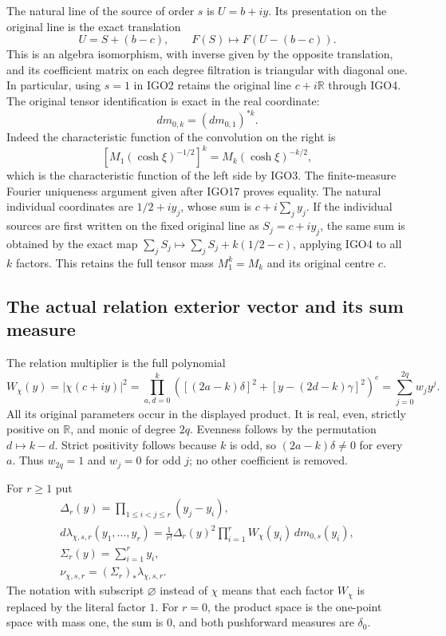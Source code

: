 \documentclass[11pt,a4paper]{article}
\begin{document}
The natural line of the source of order $s$ is $U=b+iy$.
Its presentation on the original line is the exact translation
\[
 U=S+(b-c),\qquad
 F(S)\longmapsto F(U-(b-c)).
 \tag{IGO4}
\]
This is an algebra isomorphism, with inverse given by the opposite
translation, and its coefficient matrix on each degree filtration
is triangular with diagonal one. In particular, using $s=1$ in
IGO2 retains the original line $c+i\mathbb R$ through IGO4.
The original tensor identification is exact in the real coordinate:
\[
 dm_{0,k}=(dm_{0,1})^{*k}.
\]
Indeed the characteristic function of the convolution on the right
is \[[M_1(\cosh\xi)^{-1/2}]^k
=M_k(\cosh\xi)^{-k/2},\] which is the characteristic function
of the left side by IGO3. The finite-measure Fourier uniqueness
argument given after IGO17 proves equality. The natural individual
coordinates are $1/2+iy_j$, whose sum is $c+i\sum_jy_j$.
If the individual sources are first written on the fixed original
line as $S_j=c+iy_j$, the same sum is obtained by the exact map
$\sum_jS_j\mapsto\sum_jS_j+k(1/2-c)$, applying IGO4 to all
$k$ factors. This retains the full tensor mass $M_1^k=M_k$
and its original centre $c$.

\subsection{The actual relation exterior vector and its sum measure}
The relation multiplier is the full polynomial
\[
 W_\chi(y)=|\chi(c+iy)|^2
 =\prod_{a,d=0}^{k}
 \left([(2a-k)\delta]^2+[y-(2d-k)\gamma]^2\right)^e
 =\sum_{j=0}^{2q}w_jy^j.
 \tag{IGO5}
\]
All its original parameters occur in the displayed product.
It is real, even, strictly positive on $\mathbb R$, and monic of
degree $2q$. Evenness follows by the permutation $d\mapsto k-d$.
Strict positivity follows because $k$ is odd, so
$(2a-k)\delta\ne0$ for every $a$. Thus $w_{2q}=1$ and
$w_j=0$ for odd $j$; no other coefficient is removed.

For $r\geq1$ put
\[
 \begin{gathered}
 \Delta_r(y)=\prod_{1\leq i<j\leq r}(y_j-y_i),\\
 d\lambda_{\chi,s,r}(y_1,\ldots,y_r)
 =\frac1{r!}\Delta_r(y)^2
       \prod_{i=1}^r W_\chi(y_i)\,dm_{0,s}(y_i),
 \\ \Sigma_r(y)=\sum_{i=1}^r y_i,
 \\
 \nu_{\chi,s,r}=(\Sigma_r)_*\lambda_{\chi,s,r}.
 \end{gathered}
 \tag{IGO6}
\]
The notation with subscript $\varnothing$ instead of $\chi$ means
that each factor $W_\chi$ is replaced by the literal factor $1$.
For $r=0$, the product space is the one-point space with mass one,
the sum is $0$, and both pushforward measures are $\delta_0$.
\end{document}
